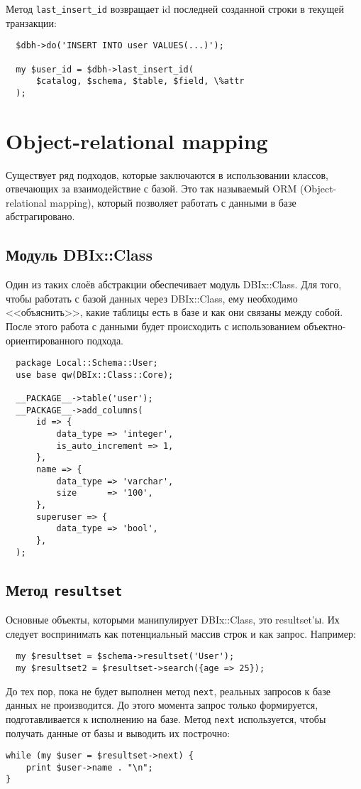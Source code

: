 Метод \verb|last_insert_id| возвращает id последней созданной строки в текущей транзакции:
\begin{verbatim}
  $dbh->do('INSERT INTO user VALUES(...)');

  my $user_id = $dbh->last_insert_id(
      $catalog, $schema, $table, $field, \%attr
  );
\end{verbatim}

\section{Object-relational mapping}
Существует ряд подходов, которые заключаются в использовании классов, отвечающих за взаимодействие с базой. Это так называемый ORM (Object-relational mapping), который позволяет работать с данными в базе абстрагировано.

\subsection{Модуль DBIx::Class}
Один из таких слоёв абстракции обеспечивает модуль DBIx::Class. Для того, чтобы работать с базой данных через DBIx::Class, ему необходимо <<объяснить>>, какие таблицы есть в базе и как они связаны между собой. После этого работа с данными будет происходить с использованием объектно-ориентированного подхода.
\begin{verbatim}
  package Local::Schema::User;
  use base qw(DBIx::Class::Core);

  __PACKAGE__->table('user');
  __PACKAGE__->add_columns(
      id => {
          data_type => 'integer',
          is_auto_increment => 1,
      },
      name => {
          data_type => 'varchar',
          size      => '100',
      },
      superuser => {
          data_type => 'bool',
      },
  );
\end{verbatim}

\subsection{Метод \texttt{resultset}}
Основные объекты, которыми манипулирует DBIx::Class, это resultset'ы.
Их следует воспринимать как потенциальный массив строк и как запрос. Например:
\begin{verbatim}
  my $resultset = $schema->resultset('User');
  my $resultset2 = $resultset->search({age => 25});
\end{verbatim}

До тех пор, пока не будет выполнен метод \verb|next|,
реальных запросов к базе данных не производится.
До этого момента запрос только формируется, подготавливается к исполнению на базе.
Метод \verb|next| используется, чтобы получать данные от базы и выводить их построчно:
\begin{verbatim}
while (my $user = $resultset->next) {
    print $user->name . "\n";
}
\end{verbatim}

